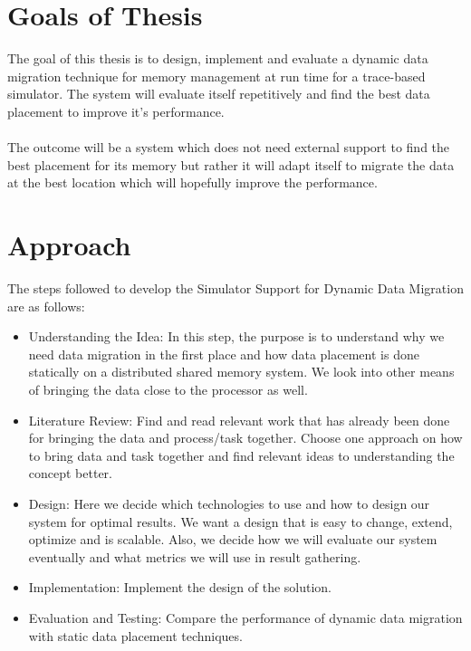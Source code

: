 \documentclass{listhesis}
\begin{document}
\section{Goals of Thesis}
The goal of this thesis is to design, implement and evaluate a dynamic data migration technique for memory management at run time for a trace-based simulator. The system will evaluate itself repetitively and find the best data placement to improve it's performance. \\
\\
The outcome will be a system which does not need external support to find the best placement for its memory but rather it will adapt itself to migrate the data at the best location which will hopefully improve the performance. 
\section{Approach}
The steps followed to develop the Simulator Support for Dynamic Data Migration are as follows:
\begin{itemize}
  \item Understanding the Idea: In this step, the purpose is to understand why we need data migration in the first place and how data placement is done statically on a distributed shared memory system. We look into other means of bringing the data close to the processor as well. 
  \item Literature Review: Find and read relevant work that has already been done for bringing the data and process/task together. Choose one approach on how to bring data and task together and find relevant ideas to understanding the concept better. 
  \item Design: Here we decide which technologies to use and how to design our system for optimal results. We want a design that is easy to change, extend, optimize and is scalable. Also, we decide how we will evaluate our system eventually and what metrics we will use in result gathering. 
  \item Implementation: Implement the design of the solution. 
  \item Evaluation and Testing: Compare the performance of dynamic data migration with static data placement techniques.
\end{itemize}
\end{document}
